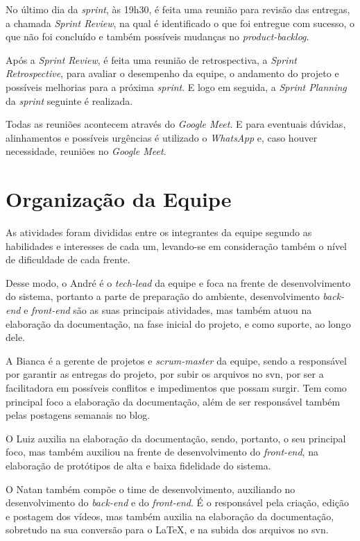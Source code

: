No último dia da \textit{\gls{sprint}}, às 19h30, é feita uma reunião para revisão das entregas, a chamada \textit{Sprint Review}, na qual é identificado o que foi entregue com sucesso, o que não foi concluído e também possíveis mudanças no \textit{\gls{product-backlog}}. 


Após a \textit{Sprint Review}, é feita uma reunião de retrospectiva, a \textit{Sprint Retrospective}, para avaliar o desempenho da equipe, o andamento do projeto e possíveis melhorias para a próxima \textit{\gls{sprint}}. E logo em seguida, a \textit{Sprint Planning} da \textit{\gls{sprint}} seguinte é realizada.


Todas as reuniões acontecem através do \textit{Google Meet}.
E para eventuais dúvidas, alinhamentos e possíveis urgências é utilizado o \textit{WhatsApp} e, caso houver necessidade, reuniões no \textit{Google Meet}. 


\section{Organização da Equipe}
As atividades foram divididas entre os integrantes da equipe segundo as habilidades e interesses de cada um, levando-se em consideração também o nível de dificuldade de cada frente.


Desse modo, o André é o \textit{\gls{tech-lead}} da equipe e foca na frente de desenvolvimento do sistema, portanto a parte de preparação do ambiente, desenvolvimento \textit{\gls{back-end}} e \textit{\gls{front-end}} são as suas principais atividades, mas também atuou na elaboração da documentação, na fase inicial do projeto, e como suporte, ao longo dele.

A Bianca é a gerente de projetos e \textit{\gls{scrum-master}} da equipe, sendo a responsável por garantir as entregas do projeto, por subir os arquivos no \ac{svn}, por ser a facilitadora em possíveis conflitos e impedimentos que possam surgir. Tem como principal foco a elaboração da documentação, além de ser responsável também pelas postagens semanais no blog.

O Luiz auxilia na elaboração da documentação, sendo, portanto, o seu principal foco, mas também auxiliou na frente de desenvolvimento do \textit{\gls{front-end}}, na elaboração de protótipos de alta e baixa fidelidade do sistema.

O Natan também compõe o time de desenvolvimento, auxiliando no desenvolvimento do \textit{\gls{back-end}} e do \textit{\gls{front-end}}. É o responsável pela criação, edição e postagem dos vídeos, mas também auxilia na elaboração da documentação, sobretudo na sua conversão para o LaTeX, e na subida dos arquivos no \ac{svn}.

